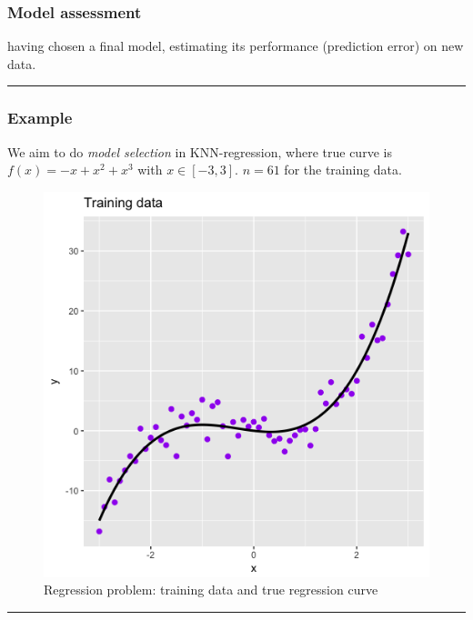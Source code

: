 \documentclass[]{article}
\begin{document}
\hypertarget{model-assessment}{%
\subsubsection{Model assessment}\label{model-assessment}}

having chosen a final model, estimating its performance (prediction
error) on new data.

\begin{center}\rule{0.5\linewidth}{\linethickness}\end{center}

\hypertarget{example}{%
\subsubsection{Example}\label{example}}

We aim to do \emph{model selection} in KNN-regression, where true curve
is \(f(x)=-x+x^2+x^3\) with \(x \in [-3,3]\). \(n=61\) for the training
data.

\begin{figure}
\centering
\includegraphics{Prob1f1.png}
\caption{Regression problem: training data and true regression curve}
\end{figure}

\begin{center}\rule{0.5\linewidth}{\linethickness}\end{center}
\end{document}
